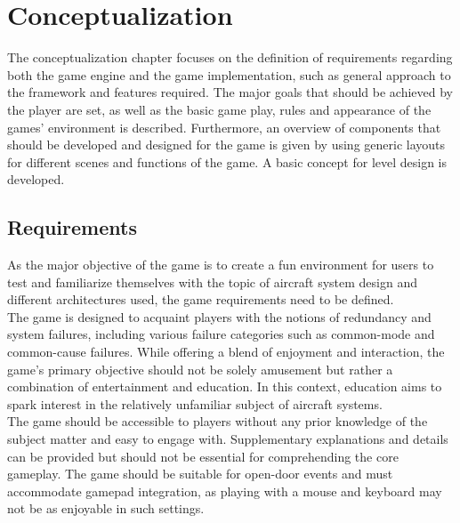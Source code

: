 
\chapter{Conceptualization}\label{ch:design}
The conceptualization chapter focuses on the definition of requirements regarding both the game engine and the game implementation, such as
general approach to the framework and features required.
The major goals that should be achieved by the player are set, as well as the basic game play, rules and appearance of the games' environment is described.
Furthermore, an overview of components that should be developed and designed for the game is given by using generic layouts for different scenes
and functions of the game.
A basic concept for level design is developed.

\section{Requirements}\label{sec:requirements}
As the major objective of the game is to create a fun environment for users to test and familiarize themselves with the topic of
aircraft system design and different architectures used, the game requirements need to be defined.
\\
The game is designed to acquaint players with the notions of redundancy and system failures, including various
failure categories such as common-mode and common-cause failures.
While offering a blend of enjoyment and interaction, the game's primary objective should not be solely amusement but
rather a combination of entertainment and education.
In this context, education aims to spark interest in the relatively unfamiliar subject of aircraft systems.
\\
The game should be accessible to players without any prior knowledge of the subject matter and easy to engage with.
Supplementary explanations and details can be provided but should not be essential for comprehending the core gameplay.
The game should be suitable for open-door events and must accommodate gamepad integration, as playing with a mouse and
keyboard may not be as enjoyable in such settings.

